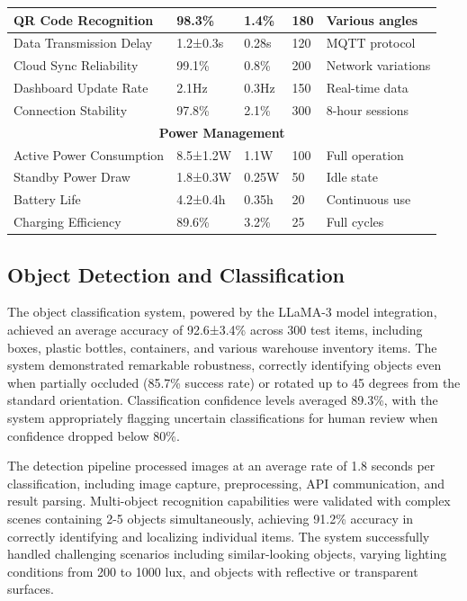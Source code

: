 \begin{table}[h!]
\begin{tabular}{|p{4cm}|p{2.5cm}|p{2cm}|p{2cm}|p{2.5cm}|}
\hline
QR Code Recognition & 98.3\% & 1.4\% & 180 & Various angles \\
\hline
Data Transmission Delay & 1.2±0.3s & 0.28s & 120 & MQTT protocol \\
\hline
Cloud Sync Reliability & 99.1\% & 0.8\% & 200 & Network variations \\
\hline
Dashboard Update Rate & 2.1Hz & 0.3Hz & 150 & Real-time data \\
\hline
Connection Stability & 97.8\% & 2.1\% & 300 & 8-hour sessions \\
\hline
\multicolumn{5}{|c|}{\textbf{Power Management}} \\
\hline
Active Power Consumption & 8.5±1.2W & 1.1W & 100 & Full operation \\
\hline
Standby Power Draw & 1.8±0.3W & 0.25W & 50 & Idle state \\
\hline
Battery Life & 4.2±0.4h & 0.35h & 20 & Continuous use \\
\hline
Charging Efficiency & 89.6\% & 3.2\% & 25 & Full cycles \\
\hline
\end{tabular}
\end{table}

\subsection{Object Detection and Classification}

The object classification system, powered by the LLaMA-3 model integration, achieved an average accuracy of 92.6±3.4\% across 300 test items, including boxes, plastic bottles, containers, and various warehouse inventory items. The system demonstrated remarkable robustness, correctly identifying objects even when partially occluded (85.7\% success rate) or rotated up to 45 degrees from the standard orientation. Classification confidence levels averaged 89.3\%, with the system appropriately flagging uncertain classifications for human review when confidence dropped below 80\%.

The detection pipeline processed images at an average rate of 1.8 seconds per classification, including image capture, preprocessing, API communication, and result parsing. Multi-object recognition capabilities were validated with complex scenes containing 2-5 objects simultaneously, achieving 91.2\% accuracy in correctly identifying and localizing individual items. The system successfully handled challenging scenarios including similar-looking objects, varying lighting conditions from 200 to 1000 lux, and objects with reflective or transparent surfaces.

